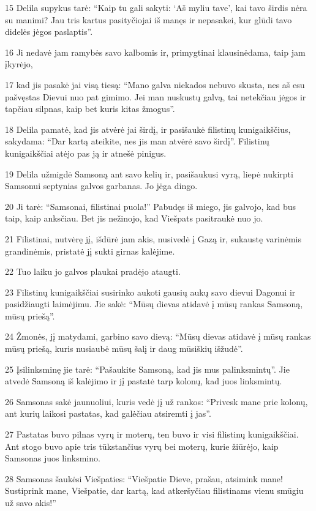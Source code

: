 \par 15 Delila supykus tarė: “Kaip tu gali sakyti: ‘Aš myliu tave’, kai tavo širdis nėra su manimi? Jau tris kartus pasityčiojai iš manęs ir nepasakei, kur glūdi tavo didelės jėgos paslaptis”. 
\par 16 Ji nedavė jam ramybės savo kalbomis ir, primygtinai klausinėdama, taip jam įkyrėjo, 
\par 17 kad jis pasakė jai visą tiesą: “Mano galva niekados nebuvo skusta, nes aš esu pašvęstas Dievui nuo pat gimimo. Jei man nuskustų galvą, tai netekčiau jėgos ir tapčiau silpnas, kaip bet kuris kitas žmogus”. 
\par 18 Delila pamatė, kad jis atvėrė jai širdį, ir pasišaukė filistinų kunigaikščius, sakydama: “Dar kartą ateikite, nes jis man atvėrė savo širdį”. Filistinų kunigaikščiai atėjo pas ją ir atnešė pinigus. 
\par 19 Delila užmigdė Samsoną ant savo kelių ir, pasišaukusi vyrą, liepė nukirpti Samsonui septynias galvos garbanas. Jo jėga dingo. 
\par 20 Ji tarė: “Samsonai, filistinai puola!” Pabudęs iš miego, jis galvojo, kad bus taip, kaip anksčiau. Bet jis nežinojo, kad Viešpats pasitraukė nuo jo. 
\par 21 Filistinai, nutvėrę jį, išdūrė jam akis, nusivedė į Gazą ir, sukaustę varinėmis grandinėmis, pristatė jį sukti girnas kalėjime. 
\par 22 Tuo laiku jo galvos plaukai pradėjo ataugti. 
\par 23 Filistinų kunigaikščiai susirinko aukoti gausių aukų savo dievui Dagonui ir pasidžiaugti laimėjimu. Jie sakė: “Mūsų dievas atidavė į mūsų rankas Samsoną, mūsų priešą”. 
\par 24 Žmonės, jį matydami, garbino savo dievą: “Mūsų dievas atidavė į mūsų rankas mūsų priešą, kuris nusiaubė mūsų šalį ir daug mūsiškių išžudė”. 
\par 25 Įsilinksminę jie tarė: “Pašaukite Samsoną, kad jis mus palinksmintų”. Jie atvedė Samsoną iš kalėjimo ir jį pastatė tarp kolonų, kad juos linksmintų. 
\par 26 Samsonas sakė jaunuoliui, kuris vedė jį už rankos: “Privesk mane prie kolonų, ant kurių laikosi pastatas, kad galėčiau atsiremti į jas”. 
\par 27 Pastatas buvo pilnas vyrų ir moterų, ten buvo ir visi filistinų kunigaikščiai. Ant stogo buvo apie tris tūkstančius vyrų bei moterų, kurie žiūrėjo, kaip Samsonas juos linksmino. 
\par 28 Samsonas šaukėsi Viešpaties: “Viešpatie Dieve, prašau, atsimink mane! Sustiprink mane, Viešpatie, dar kartą, kad atkeršyčiau filistinams vienu smūgiu už savo akis!” 
